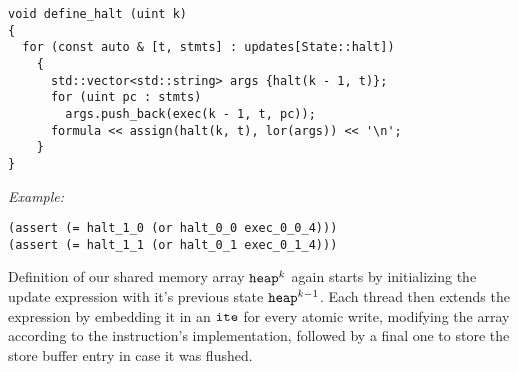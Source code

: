 \begin{lstlisting}[style=c++]
void define_halt (uint k)
{
  for (const auto & [t, stmts] : updates[State::halt])
    {
      std::vector<std::string> args {halt(k - 1, t)};
      for (uint pc : stmts)
        args.push_back(exec(k - 1, t, pc));
      formula << assign(halt(k, t), lor(args)) << '\n';
    }
}
\end{lstlisting}

\noindent
\emph{Example:} 

\begin{lstlisting}[style=smtlib]
(assert (= halt_1_0 (or halt_0_0 exec_0_0_4)))
(assert (= halt_1_1 (or halt_0_1 exec_0_1_4)))
\end{lstlisting}


\noindent
Definition of our shared memory array $\texttt{heap}^k$ again starts by initializing the update expression with it's previous state $\texttt{heap}^{k - 1}$.
Each thread then extends the expression by embedding it in an $\texttt{ite}$ for every atomic write, modifying the array according to the instruction's  implementation, followed by a final one to store the store buffer entry in case it was flushed.
%

